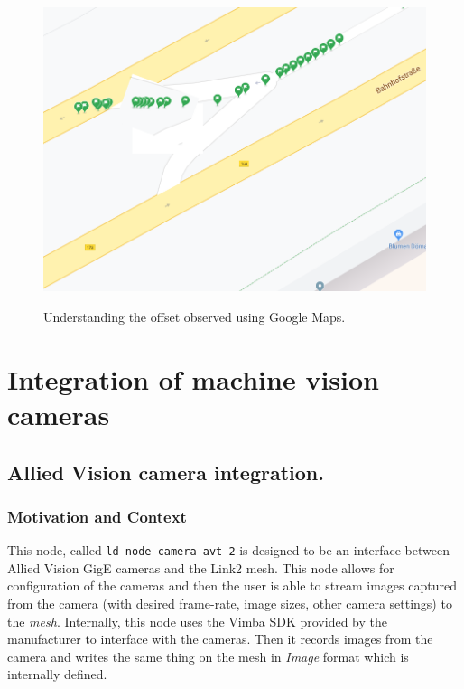 \documentclass[a4paper, 12pt, oneside]{report}
\begin{document}
  \begin{figure}[h]
      \caption{Understanding the offset observed using Google Maps.}
      \centering
      \includegraphics[width=1\textwidth]{offseterrorcorrected}
      \label{fig:plottingongmaps-offset-corrected}
  \end{figure}
            
  \newpage
  
  
  \chapter{Integration of machine vision cameras}

  \section{Allied Vision camera integration.}
  \subsection{Motivation and Context}
  This node, called \texttt{ld-node-camera-avt-2} \cite{NumericalAdvantageldnodecameraavt2ALink2nodetointerfacewithAlliedVisionMakoGmonochromemachinevisioncamera-2020-02-20} is designed to be an interface between Allied Vision GigE cameras \cite{MakoGDocumentationAlliedVision-2020-02-12} and the Link2 mesh. This node allows for configuration of the cameras and then the user is able to stream images captured from the camera (with desired frame-rate, image sizes, other camera settings) to the \textit{mesh}. Internally, this node uses the Vimba SDK provided by the manufacturer to interface with the cameras. Then it records images from the camera and writes the same thing on the mesh in \textit{Image} format which is internally defined.
  
\end{document}
